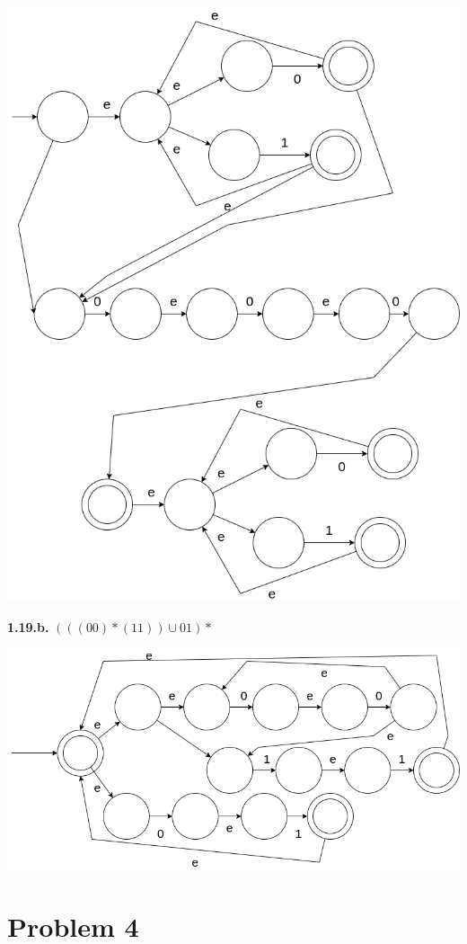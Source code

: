 \documentclass[11pt]{article}
\begin{document}
\begin{center}
\includegraphics[scale=0.4]{02/HW02-1.19.a.png} 
\end{center}
\newpage
\textbf{1.19.b.} $(((00)*(11))\cup01)*$
\begin{center}
\includegraphics[scale=0.5]{02/HW02-1.19.b.png} 
\end{center}
\newpage
\section*{Problem 4}
\end{document}
